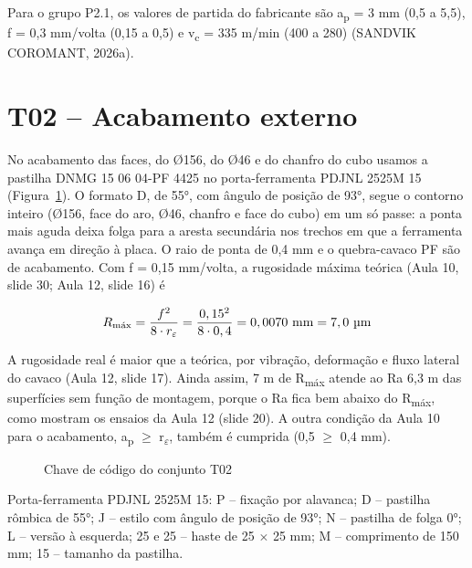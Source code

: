 Para o grupo P2.1, os valores de partida do fabricante são a\textsubscript{p} = 3 mm (0,5 a 5,5), f = 0,3 mm/volta (0,15 a 0,5) e v\textsubscript{c} = 335 m/min (400 a 280) (SANDVIK COROMANT, 2026a).

\section{T02 – Acabamento externo}

No acabamento das faces, do Ø156, do Ø46 e do chanfro do cubo usamos a pastilha DNMG 15 06 04-PF 4425 no porta-ferramenta PDJNL 2525M 15 (Figura~\ref{fig:chaveT02}). O formato D, de 55°, com ângulo de posição de 93°, segue o contorno inteiro (Ø156, face do aro, Ø46, chanfro e face do cubo) em um só passe: a ponta mais aguda deixa folga para a aresta secundária nos trechos em que a ferramenta avança em direção à placa. O raio de ponta de 0,4 mm e o quebra-cavaco PF são de acabamento. Com f = 0,15 mm/volta, a rugosidade máxima teórica (Aula 10, slide 30; Aula 12, slide 16) é

\[
  R_{\text{máx}} = \frac{f^{2}}{8 \cdot r_{\varepsilon}} = \frac{0,15^{2}}{8 \cdot 0,4} = 0,0070 \ \text{mm} = 7,0 \ \text{\textmu m}
\]

A rugosidade real é maior que a teórica, por vibração, deformação e fluxo lateral do cavaco (Aula 12, slide 17). Ainda assim, 7 \textmu{}m de R\textsubscript{máx} atende ao Ra 6,3 \textmu{}m das superfícies sem função de montagem, porque o Ra fica bem abaixo do R\textsubscript{máx}, como mostram os ensaios da Aula 12 (slide 20). A outra condição da Aula 10 para o acabamento, a\textsubscript{p} $\geq$ r\textsubscript{$\varepsilon$}, também é cumprida (0,5 $\geq$ 0,4 mm).

\begin{figure}[H]
\centering
\caption{Chave de código do conjunto T02}\label{fig:chaveT02}
\par\medskip
{}
\end{figure}

\noindent Porta-ferramenta PDJNL 2525M 15: P – fixação por alavanca; D – pastilha rômbica de 55°; J – estilo com ângulo de posição de 93°; N – pastilha de folga 0°; L – versão à esquerda; 25 e 25 – haste de 25 $\times$ 25 mm; M – comprimento de 150 mm; 15 – tamanho da pastilha.

